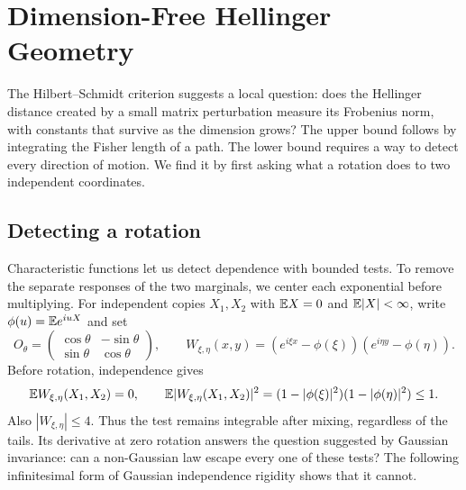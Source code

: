 \section{Dimension-Free Hellinger Geometry}
\label{sec:dimension-free-hellinger-geometry}

The Hilbert--Schmidt criterion suggests a local question: does the Hellinger
distance created by a small matrix perturbation measure its Frobenius norm,
with constants that survive as the dimension grows? The upper bound follows
by integrating the Fisher length of a path. The lower bound requires a way
to detect every direction of motion. We find it by first asking what a
rotation does to two independent coordinates.

\subsection{Detecting a rotation}

Characteristic functions let us detect dependence with bounded tests. To
remove the separate responses of the two marginals, we center each
exponential before multiplying. For independent copies \(X_1,X_2\) with
\(\mathbb E X=0\) and \(\mathbb E|X|<\infty\), write \(\phi(u)=\mathbb E e^{iuX}\) and set
\[
 O_\theta=\begin{pmatrix}\cos\theta&-\sin\theta\\
                         \sin\theta&\cos\theta\end{pmatrix},
 \qquad
 W_{\xi,\eta}(x,y)
   =(e^{i\xi x}-\phi(\xi))(e^{i\eta y}-\phi(\eta)).
\]
Before rotation, independence gives
\begin{equation}
 \mathbb E W_{\xi,\eta}(X_1,X_2)=0,
 \qquad
 \mathbb E|W_{\xi,\eta}(X_1,X_2)|^2
 =(1-|\phi(\xi)|^2)(1-|\phi(\eta)|^2)\le1.
\end{equation}
Also \(|W_{\xi,\eta}|\le4\). Thus the test remains integrable after mixing,
regardless of the tails. Its derivative at zero rotation answers the
question suggested by Gaussian invariance: can a non-Gaussian law escape
every one of these tests? The following infinitesimal form of Gaussian
independence rigidity \cite{kac1939characterization,kagan1973characterization}
shows that it cannot.

